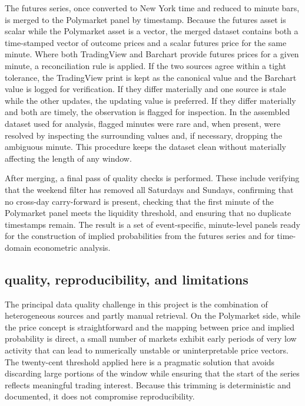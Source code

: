 The futures series, once converted to New York time and reduced to minute bars, is merged to the Polymarket panel by timestamp. Because the futures asset is scalar while the Polymarket asset is a vector, the merged dataset contains both a time-stamped vector of outcome prices and a scalar futures price for the same minute. Where both TradingView and Barchart provide futures prices for a given minute, a reconciliation rule is applied. If the two sources agree within a tight tolerance, the TradingView print is kept as the canonical value and the Barchart value is logged for verification. If they differ materially and one source is stale while the other updates, the updating value is preferred. If they differ materially and both are timely, the observation is flagged for inspection. In the assembled dataset used for analysis, flagged minutes were rare and, when present, were resolved by inspecting the surrounding values and, if necessary, dropping the ambiguous minute. This procedure keeps the dataset clean without materially affecting the length of any window.

After merging, a final pass of quality checks is performed. These include verifying that the weekend filter has removed all Saturdays and Sundays, confirming that no cross-day carry-forward is present, checking that the first minute of the Polymarket panel meets the liquidity threshold, and ensuring that no duplicate timestamps remain. The result is a set of event-specific, minute-level panels ready for the construction of implied probabilities from the futures series and for time-domain econometric analysis.

\subsection{quality, reproducibility, and limitations}

The principal data quality challenge in this project is the combination of heterogeneous sources and partly manual retrieval. On the Polymarket side, while the price concept is straightforward and the mapping between price and implied probability is direct, a small number of markets exhibit early periods of very low activity that can lead to numerically unstable or uninterpretable price vectors. The twenty-cent threshold applied here is a pragmatic solution that avoids discarding large portions of the window while ensuring that the start of the series reflects meaningful trading interest. Because this trimming is deterministic and documented, it does not compromise reproducibility.

